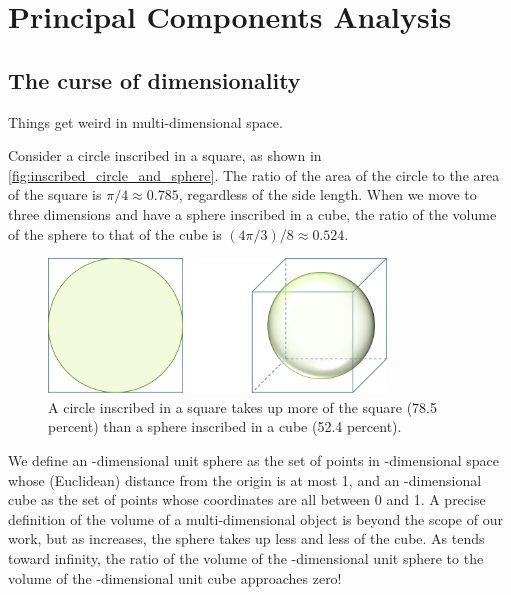 \FloatBarrier
{}

\section{Principal Components Analysis}
\label{sec:pca}

\subsection{The curse of dimensionality}

Things get weird in multi-dimensional space.

Consider a circle inscribed in a square, as shown in \autoref{fig:inscribed_circle_and_sphere}. The ratio of the area of the circle to the area of the square is $π/4 \approx 0.785$, regardless of the side length. When we move to three dimensions and have a sphere inscribed in a cube, the ratio of the volume of the sphere to that of the cube is $(4π/3)/8 \approx 0.524$.\\

\begin{figure}[h]
\centering
\mySfFamily
\includegraphics[width = 0.8\textwidth]{../images/inscribed_circle_and_sphere.png}
\caption{A circle inscribed in a square takes up more of the square (78.5 percent) than a sphere inscribed in a cube (52.4 percent).}
\label{fig:inscribed_circle_and_sphere}
\end{figure}

We define an -dimensional unit sphere as the set of points in -dimensional space whose (Euclidean) distance from the origin is at most 1, and an -dimensional cube as the set of points whose coordinates are all between 0 and 1. A precise definition of the volume of a multi-dimensional object is beyond the scope of our work, but as  increases, the sphere takes up less and less of the cube. As  tends toward infinity, the ratio of the volume of the -dimensional unit sphere to the volume of the -dimensional unit cube approaches zero!

